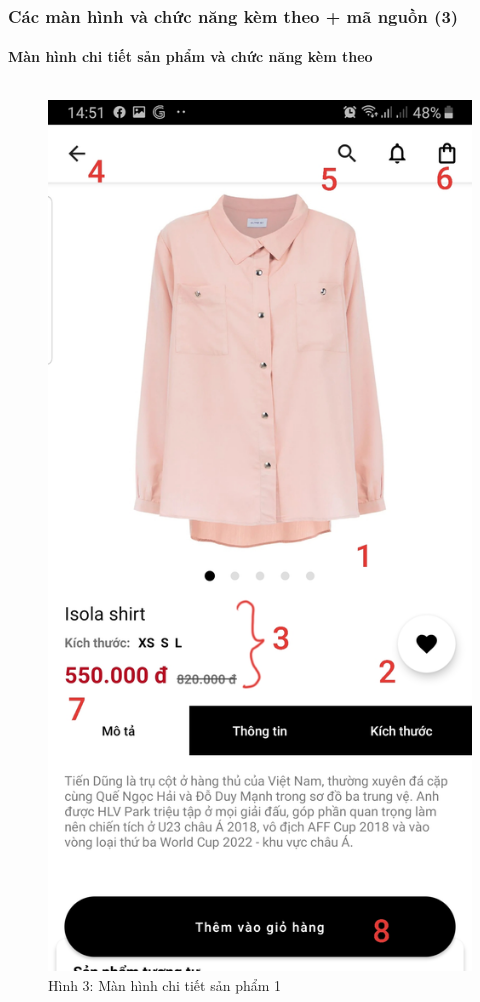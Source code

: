 \documentclass{beamer}
\begin{document}
\begin{frame}
    \frametitle{Các màn hình và chức năng kèm theo + mã nguồn (3)}
    \framesubtitle{Màn hình chi tiết sản phẩm và chức năng kèm theo}

    \begin{columns}
        \begin{figure}
            \centering
            \includegraphics[height=0.7\textheight]{images/03.png}
            \caption{\centering\tiny{Hình 3: Màn hình chi tiết sản phẩm 1}}


\end{figure}
\end{columns}
\end{frame}
\end{document}
